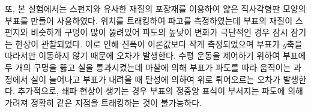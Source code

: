 


또, 본 실험에서는 스펀지와 유사한 재질의 포장재를 이용하여 얇은 직사각형판 모양의 부표를 만들어 사용하였다. 위치를 트래킹하여 파고를 측정하였는데 부표의 재질이 스펀지와 비슷하게 구멍이 많이 뚫려있어 파도의 높낮이 변화가 극단적인 경우 잠시 잠기는 현상이 관찰되었다. 이로 인해 진폭이 이론값보다 작게 측정되었으며 부표가 $y$축을 따라서만 이동하지 않기 때문에 오차가 발생한다. 수평 운동을 제어하기 위하여 부표에 두 개의 구멍을 뚫고 실을 통과시켰는데 마찰에 의해 부표가 파도를 따라 움직이는 과정에서 실이 늘어나고 부표가 내려올 때 탄성에 의하여 위로 튀어오르는 오차가 발생한다. 추가적으로, 쇄파 현상이 생기는 경우 부표의 정중앙 표식이 부서지는 파도에 의해 가려져 정확히 같은 지점을 트래킹하는 것이 불가능하다.
